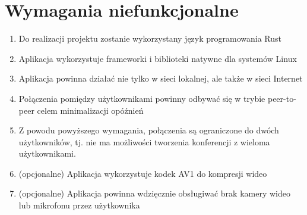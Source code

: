 \section{Wymagania niefunkcjonalne}

\begin{enumerate}
	\item Do realizacji projektu zostanie wykorzystany język programowania Rust
	\item Aplikacja wykorzystuje frameworki i biblioteki natywne dla systemów Linux
	\item Aplikacja powinna działać nie tylko w sieci lokalnej, ale także w sieci Internet
	\item Połączenia pomiędzy użytkownikami powinny odbywać się w trybie peer-to-peer celem
	      minimalizacji opóźnień
	\item Z powodu powyższego wymagania, połączenia są ograniczone do dwóch użytkowników, tj. nie ma
	      możliwości tworzenia konferencji z wieloma użytkownikami.
	\item (opcjonalne) Aplikacja wykorzystuje kodek AV1 do kompresji wideo
	\item (opcjonalne) Aplikacja powinna wdzięcznie obsługiwać brak kamery wideo lub mikrofonu przez
	      użytkownika
\end{enumerate}
